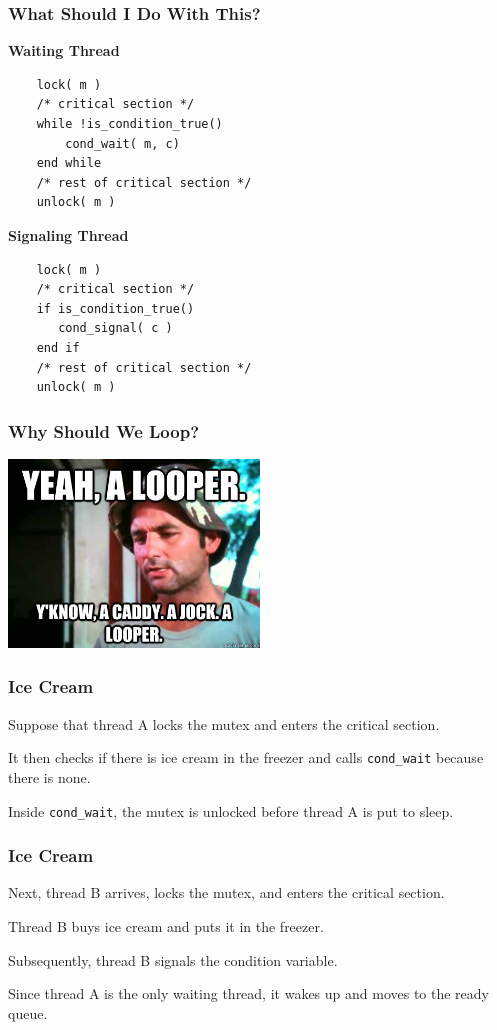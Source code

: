 \begin{frame}[fragile]
	\frametitle{What Should I Do With This?}

	{\small
	\begin{multicols}{2}
		\textbf{Waiting Thread}
		\begin{verbatim}
	lock( m )
	/* critical section */
	while !is_condition_true()
	    cond_wait( m, c)
	end while
	/* rest of critical section */
	unlock( m )
		\end{verbatim}
		\columnbreak
		\textbf{Signaling Thread}
		\begin{verbatim}
	lock( m )
	/* critical section */
	if is_condition_true()
	   cond_signal( c )
	end if
	/* rest of critical section */
	unlock( m )

		\end{verbatim}
	\end{multicols}}

\end{frame}

\begin{frame}[fragile]
	\frametitle{Why Should We Loop?}

	\begin{center}
		\includegraphics[width=0.5\textwidth]{images/looper.jpg}
	\end{center}

\end{frame}

\begin{frame}[fragile]
	\frametitle{Ice Cream}

	Suppose that thread A locks the mutex and enters the critical section.

	It then checks if there is ice cream in the freezer and calls \texttt{cond\_wait} because there is none.

	Inside \texttt{cond\_wait}, the mutex is unlocked before thread A is put to sleep.

\end{frame}

\begin{frame}[fragile]
	\frametitle{Ice Cream}

	Next, thread B arrives, locks the mutex, and enters the critical section.

	Thread B buys ice cream and puts it in the freezer.

	Subsequently, thread B signals the condition variable.

	Since thread A is the only waiting thread, it wakes up and moves to the ready queue.

\end{frame}

